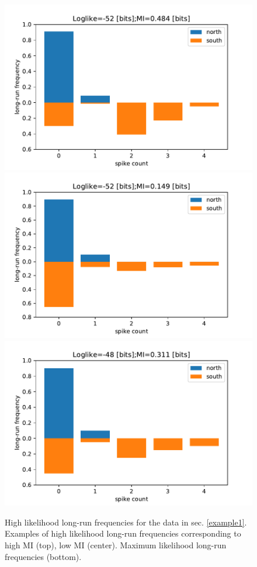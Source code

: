 \begin{figure}
\centering
\includegraphics[scale=0.5]{HighLike_Plots0.pdf}\\
\includegraphics[scale=0.5]{HighLike_Plots1.pdf}\\ 
\includegraphics[scale=0.5]{HighLike_Plots_MaxLike.pdf} 
\label{fig:highlike_long-run_freqs}
\caption{High likelihood long-run frequencies for the data in sec. \ref{example1}. Examples of high likelihood long-run frequencies corresponding to high MI (top), low MI (center). Maximum likelihood long-run frequencies (bottom).}
\end{figure}

